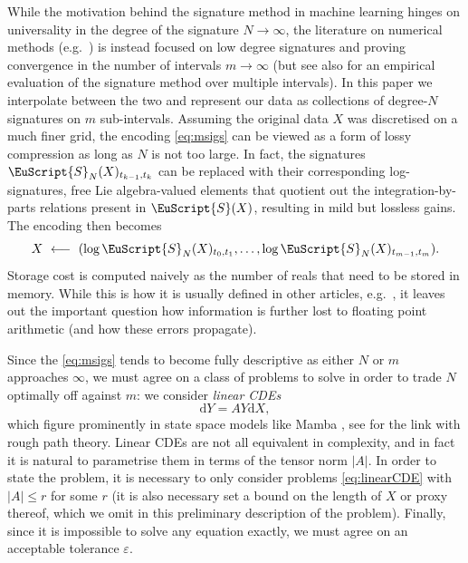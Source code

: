 \documentclass{article}
\def\d{\mathrm{d}}
\def\Sig{\EuScript{S}}
\numberwithin{equation}{section}
\theoremstyle{definition}
\theoremstyle{remark}
\begin{document}
While the motivation behind the signature method in machine learning hinges on universality in the degree of the signature $N \to \infty$, the literature on numerical methods (e.g.\ \cite{KP10}) is instead focused on low degree signatures and proving convergence in the number of intervals $m \to \infty$ (but see also \cite{MFKL21} for an empirical evaluation of the signature method over multiple intervals). In this paper we interpolate between the two and represent our data as collections of degree-$N$ signatures on $m$ sub-intervals. Assuming the original data $X$ was discretised on a much finer grid, the encoding \eqref{eq:msigs} can be viewed as a form of lossy compression as long as $N$ is not too large. In fact, the signatures $\Sig_N(X)_{t_{k-1},t_k}$ can be replaced with their corresponding log-signatures, free Lie algebra-valued elements that quotient out the integration-by-parts relations present in $\Sig(X)$, resulting in mild but lossless gains. The encoding then becomes
\begin{equation}\label{eq:msigs}
X \ \longleftarrow \ (\log\Sig_N(X)_{t_0,t_1}, \ldots, \log\Sig_N(X)_{t_{m-1}, t_m}).
\end{equation}
Storage cost is computed naively as the number of reals that need to be stored in memory. While this is how it is usually defined in other articles, e.g.\ \cite{Fef09}, it leaves out the important question how information is further lost to floating point arithmetic (and how these errors propagate).


Since the \eqref{eq:msigs} tends to become fully descriptive as either $N$ or $m$ approaches $\infty$, we must agree on a class of problems to solve in order to trade $N$ optimally off against $m$: we consider \emph{linear CDEs}
\begin{equation}\label{eq:linearCDE}
\d Y = A Y \d X,
\end{equation}
which figure prominently in state space models like Mamba \cite{mamba}, see \cite{COWSL24, walker2025structured, walkerPhD} for the link with rough path theory. Linear CDEs are not all equivalent in complexity, and in fact it is natural to parametrise them in terms of the tensor norm $|A|$. In order to state the problem, it is necessary to only consider problems \eqref{eq:linearCDE} with $|A| \leq r$ for some $r$ (it is also necessary set a bound on the length of $X$ or proxy thereof, which we omit in this preliminary description of the problem). Finally, since it is impossible to solve any equation exactly, we must agree on an acceptable tolerance $\varepsilon$.
\end{document}

